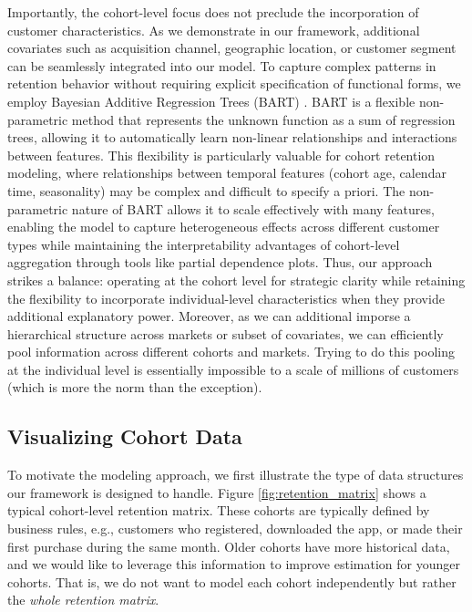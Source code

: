 \documentclass[11pt]{amsart}
\theoremstyle{definition}
\begin{document}
Importantly, the cohort-level focus does not preclude the incorporation of customer characteristics. As we demonstrate in our
framework, additional covariates such as acquisition channel, geographic location, or customer segment can be seamlessly
integrated into our model. To capture complex patterns in retention behavior without requiring explicit specification of
functional forms, we employ Bayesian Additive Regression Trees (BART) \cite{chipman2010bart}. BART is a flexible non-parametric
method that represents the unknown function as a sum of regression trees, allowing it to automatically learn non-linear
relationships and interactions between features. This flexibility is particularly valuable for cohort retention modeling, where
relationships between temporal features (cohort age, calendar time, seasonality) may be complex and difficult to specify
a priori. The non-parametric nature of BART allows it to scale effectively with many features, enabling the model to capture
heterogeneous effects across different customer types while maintaining the interpretability advantages of cohort-level
aggregation through tools like partial dependence plots. Thus, our approach strikes a balance: operating at the cohort level
for strategic clarity while retaining the flexibility to incorporate individual-level characteristics when they provide
additional explanatory power. Moreover, as we can additional imporse a hierarchical structure across markets or subset
of covariates, we can efficiently pool information across different cohorts and markets. Trying to do this pooling at
the individual level is essentially impossible to a scale of millions of customers (which is more the norm than the exception).

\subsection*{Visualizing Cohort Data}

To motivate the modeling approach, we first illustrate the type of data structures our framework is designed to handle.
Figure \ref{fig:retention_matrix} shows a typical cohort-level retention matrix. These cohorts are typically defined by 
business rules, e.g., customers who registered, downloaded the app, or made their first purchase during the same month.
Older cohorts have more historical data, and we would like to leverage this information to improve estimation for younger 
cohorts. That is, we do not want to model each cohort independently but rather the {\em whole retention matrix}.
\end{document}
